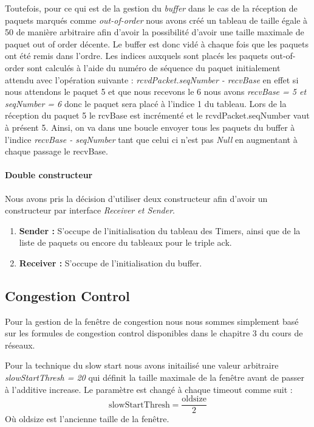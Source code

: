 \documentclass[../rapport.tex]{subfiles}
\begin{document}
	Toutefois, pour ce qui est de la gestion du \textit{buffer} dans le cas de la réception de
	paquets marqués comme \textit{out-of-order} nous avons créé un tableau de taille égale
	à 50 de manière arbitraire afin d'avoir la possibilité d'avoir une taille maximale
	de paquet out of order décente. Le buffer est donc vidé à chaque fois que les paquets ont été
	remis dans l'ordre. Les indices auxquels sont placés les paquets out-of-order sont calculés
	à l'aide du numéro de séquence du paquet initialement attendu avec l'opération suivante :
	\textit{rcvdPacket.seqNumber - recvBase} en effet si nous attendons le paquet 5 et que nous
	recevons le 6 nous avons \textit{recvBase = 5 et seqNumber = 6} donc le paquet sera placé
	à l'indice 1 du tableau. Lors de la réception du paquet 5 le rcvBase est incrémenté et le
	rcvdPacket.seqNumber vaut à présent 5. Ainsi, on va dans une boucle envoyer tous les paquets
	du buffer à l'indice \textit{recvBase - seqNumber} tant que celui ci n'est pas \textit{Null}
	en augmentant à chaque passage le recvBase. 

	\paragraph{Double constructeur} Nous avons pris la décision d'utiliser deux constructeur
	afin d'avoir un constructeur par interface \textit{Receiver et Sender}.

		\begin{enumerate}
			\item\textbf{Sender : } S'occupe de l'initialisation du tableau des Timers, ainsi que
				de la liste de paquets ou encore du tableaux pour le triple ack.
			\item\textbf{Receiver : } S'occupe de l'initialisation du buffer. 
		\end{enumerate}
		
\newpage

\subsection{Congestion Control} Pour la gestion de la fenêtre de congestion nous nous sommes 
simplement basé sur les formules de congestion control disponibles dans le chapitre 3 du cours 
de réseaux. 

\medskip

Pour la technique du slow start nous avons initailisé une valeur arbitraire 
\textit{slowStartThresh = 20 } qui définit la taille maximale de la fenêtre avant de passer à 
l'additive increase. Le paramètre est changé à chaque timeout comme suit : 
\[ \text{slowStartThresh} = \frac{\text{oldsize}}{2} \]
Où oldsize est l'ancienne taille de la fenêtre. 
\end{document}
